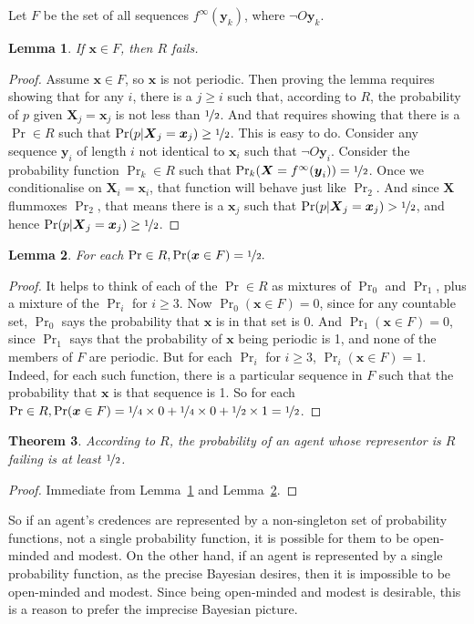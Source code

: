 \documentclass{ergoclass}
\newtheorem{theorem}{Theorem}%
\newtheorem{lemma}[theorem]{Lemma}
\newcommand{\vx}{\boldsymbol{x}}
\newcommand{\vX}{\boldsymbol{X}}
\newcommand{\vy}{\boldsymbol{y}}
\begin{document}
Let $F$ be the set of all sequences $f^\infty(\vy_k)$, where $\neg O \vy_k$.

\begin{lemma}
\label{FFail}
If $\vx \in F$, then $R$ fails.
\end{lemma}
\begin{proof}
Assume $\vx \in F$, so $\vx$ is not periodic. Then proving the lemma requires showing that for any $i$, there is a $j \geq i$ such that, according to $R$, the probability of $p$ given $\vX_j =\vx_j$ is not less than $\nicefrac{1}{2}$. And that requires showing that there is a $\Pr \in R$ such that $\Pr(p | \vX_j = \vx_j) \geq \nicefrac{1}{2}$. This is easy to do. Consider any sequence $\vy_i$ of length $i$ not identical to $\vx_i$ such that $\neg O \vy_i$. Consider the probability function $\Pr_k \in R$ such that $\Pr_k(\vX = f^\infty(\vy_i)) = \nicefrac{1}{2}$. Once we conditionalise on $\vX_i = \vx_i$, that function will behave just like $\Pr_2$. And since $\vX$ flummoxes $\Pr_2$, that means there is a $\vx_j$ such that  $\Pr(p | \vX_j = \vx_j) > \nicefrac{1}{2}$, and hence $\Pr(p | \vX_j = \vx_j) \geq \nicefrac{1}{2}$.
\end{proof}

\begin{lemma}
\label{FHalf}
For each $\Pr \in R, \Pr(\vx \in F) = \nicefrac{1}{2}.$
\end{lemma}
\begin{proof}
It helps to think of each of the $\Pr \in R$ as  mixtures of $\Pr_0$ and $\Pr_1$, plus a  mixture of the $\Pr_i$ for $i \geq 3$. Now $\Pr_0(\vx \in F) = 0$, since for any countable set, $\Pr_0$ says the probability that $\vx$ is in that set is 0. And $\Pr_1(\vx \in F) = 0$, since $\Pr_1$ says that the probability of $\vx$ being periodic is 1, and none of the members of $F$ are periodic. But for each $\Pr_i$ for $i \geq 3$, $\Pr_i(\vx \in F) = 1$. Indeed, for each such function, there is a particular sequence in $F$ such that the probability that $\vx$ is that sequence is 1. So for each $\Pr \in R, \Pr(\vx \in F) = \nicefrac{1}{4} \times 0 + \nicefrac{1}{4} \times 0 + \nicefrac{1}{2} \times 1 = \nicefrac{1}{2}$. 
\end{proof}

\begin{theorem}
\label{Modesty}
According to $R$, the probability of an agent whose representor is $R$ failing is at least $\nicefrac{1}{2}$.
\end{theorem}
\begin{proof}
Immediate from Lemma~\ref{FFail} and Lemma~\ref{FHalf}.
\end{proof}
%
\noindent So if an agent's credences are represented by a non-singleton set of probability functions, not a single probability function, it is possible for them to be open-minded and modest. On the other hand, if an agent is represented by a single probability function, as the precise Bayesian desires, then it is impossible to be open-minded and modest. Since being open-minded and modest is desirable, this is a reason to prefer the imprecise Bayesian picture.
\end{document}
